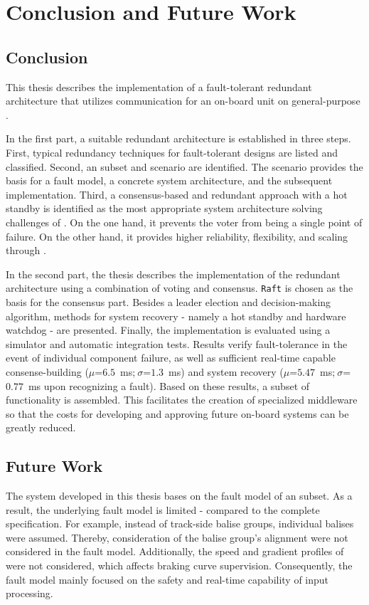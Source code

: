 \chapter{Conclusion and Future Work}

\section{Conclusion}
This thesis describes the implementation of a fault-tolerant redundant architecture that utilizes  communication for an  on-board unit on general-purpose .

In the first part, a suitable redundant architecture is established in three steps.
First, typical redundancy techniques for fault-tolerant designs are listed and classified.
Second, an  subset and scenario are identified.
The scenario provides the basis for a fault model, a concrete system architecture, and the subsequent implementation.
Third, a consensus-based and redundant approach with a hot standby is identified as the most appropriate system architecture solving challenges of .
On the one hand, it prevents the voter from being a single point of failure.
On the other hand, it provides higher reliability, flexibility, and scaling through .

In the second part, the thesis describes the implementation of the redundant architecture using a combination of voting and consensus.
\texttt{Raft} is chosen as the basis for the consensus part.
Besides a leader election and decision-making algorithm, methods for system recovery - namely a hot standby and hardware watchdog - are presented.
Finally, the implementation is evaluated using a simulator and automatic integration tests.
Results verify fault-tolerance in the event of individual component failure, as well as sufficient real-time capable consense-building ($\mu$=$6.5$~ms;$~\sigma$=$1.3$~ms) and system recovery ($\mu$=$5.47$~ms;$~\sigma$=$0.77$~ms upon recognizing a fault).
Based on these results, a subset of  functionality is assembled.
This facilitates the creation of specialized  middleware so that the costs for developing and approving future  on-board systems can be greatly reduced.


\section{Future Work}

The system developed in this thesis bases on the fault model of an  subset.
As a result, the underlying fault model is limited - compared to the complete  specification.
For example, instead of track-side balise groups, individual balises were assumed.
Thereby, consideration of the balise group's alignment were not considered in the fault model.
Additionally, the speed and gradient profiles of  were not considered, which affects braking curve supervision.
Consequently, the fault model mainly focused on the safety and real-time capability of input processing.

